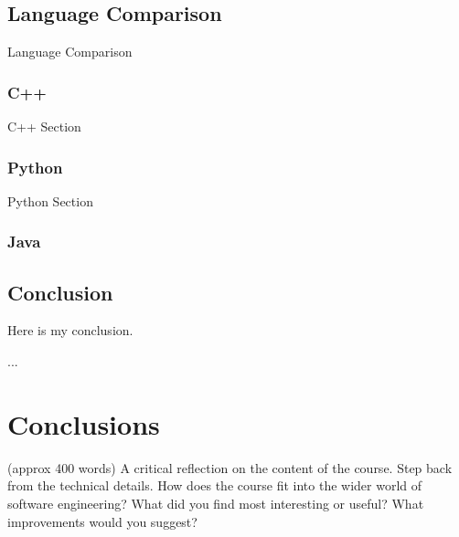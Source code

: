 \documentclass{article}
\theoremstyle{theorem}
\theoremstyle{definition}
\theoremstyle{remark}
\begin{document}
\subsection{Language Comparison}
Language Comparison

\subsubsection{C++}
C++ Section

\subsubsection{Python}
Python Section

\subsubsection{Java}


\subsection{Conclusion}
Here is my conclusion.

...

\section{Conclusions}\label{conclusions}

(approx 400 words) A critical reflection on the content of the course. Step back from the technical details. How does the course fit into the wider world of software engineering? What did you find most interesting or useful? What improvements would you suggest?
\end{document}
